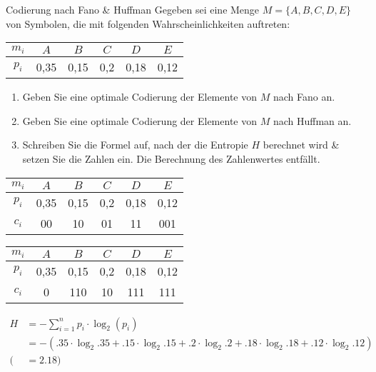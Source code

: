\documentclass{exercisesheet}
\begin{document}
  \begin{exercise*}{Codierung nach Fano \& Huffman}
    Gegeben sei eine Menge $M = \{A, B, C, D, E\}$ von Symbolen, die mit folgenden Wahrscheinlichkeiten auftreten:
    \begin{center}
      \begin{tabular}{c|ccccc}
        $m_i$ & $A$ & $B$ & $C$ & $D$ & $E$\\
        \hline
        $p_i$ & 0,35 & 0,15 & 0,2 & 0,18 & 0,12\\
      \end{tabular}
    \end{center}
    \begin{enumerate}
      \item Geben Sie eine optimale Codierung der Elemente von $M$ nach Fano an.
      \item Geben Sie eine optimale Codierung der Elemente von $M$ nach Huffman an.
      \item Schreiben Sie die Formel auf, nach der die Entropie $H$ berechnet wird \& setzen Sie die Zahlen ein. Die Berechnung des Zahlenwertes entfällt.
    \end{enumerate}
  \end{exercise*}

  \begin{solution}
    \item
      \begin{tabular}{c|ccccc}
        $m_i$ & $A$ & $B$ & $C$ & $D$ & $E$\\
        \hline
        $p_i$ & 0,35 & 0,15 & 0,2 & 0,18 & 0,12\\
        $c_i$ & 00 & 10 & 01 & 11 & 001\\
      \end{tabular}
    \item
      \begin{tabular}{c|ccccc}
        $m_i$ & $A$ & $B$ & $C$ & $D$ & $E$\\
        \hline
        $p_i$ & 0,35 & 0,15 & 0,2 & 0,18 & 0,12\\
        $c_i$ & 0 & 110 & 10 & 111 & 111\\
      \end{tabular}
    \item
      \begin{equation*}
        \begin{split}
          H &= -\sum_{i=1}^{n} p_i \cdot \log_2(p_i)\\
          &= -(.35\cdot \log_2{.35}+ .15\cdot \log_2{.15}+ .2\cdot \log_2{.2}+ .18\cdot \log_2{.18}+ .12\cdot \log_2{.12})\\
          (&=2.18)
        \end{split}
      \end{equation*}
  \end{solution}
\end{document}
